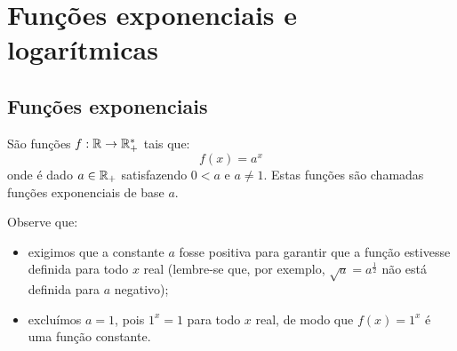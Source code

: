 
\chapter{Funções exponenciais e logarítmicas}
 \section{Funções exponenciais}

  \colorbox{azul}{
 \begin{minipage}{0.9\linewidth}
 \begin{center}
 São funções $f: \mathbb{R} \rightarrow \mathbb{R}_{+}^{*} $ tais que:
 \[f(x) = a^x\]
 onde é dado $a \in \mathbb{R}_{+}$ satisfazendo $0 < a$ e $a \neq 1$. Estas funções são chamadas funções exponenciais de base $a$.
 \end{center}
 \end{minipage}}
 \vskip0.3cm

 Observe que:
 \begin{itemize}
  \item exigimos que a constante $a$ fosse positiva para garantir que a função estivesse definida para todo $x$ real (lembre-se que, por exemplo, $\sqrt{a}= a^{\frac{1}{2}}$ não está definida para $a$ negativo);
  \item excluímos $a=1$, pois $1^x=1$ para todo $x$ real, de modo que $f(x)= 1^x$ é uma função constante.
 \end{itemize}

